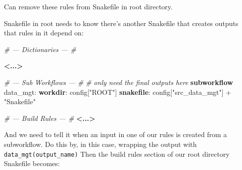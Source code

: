 \documentclass[]{book}
\newenvironment{Shaded}{\begin{snugshade}}{\end{snugshade}}
\newcommand{\KeywordTok}[1]{\textcolor[rgb]{0.13,0.29,0.53}{\textbf{{#1}}}}
\newcommand{\StringTok}[1]{\textcolor[rgb]{0.31,0.60,0.02}{{#1}}}
\newcommand{\CommentTok}[1]{\textcolor[rgb]{0.56,0.35,0.01}{\textit{{#1}}}}
\newcommand{\NormalTok}[1]{{#1}}
\theoremstyle{definition}
\theoremstyle{definition}
\theoremstyle{definition}
\theoremstyle{remark}
\begin{document}
Can remove these rules from Snakefile in root directory.

Snakefile in root needs to know there's another Snakefile that creates
outputs that rules in it depend on:

\begin{Shaded}
\begin{Highlighting}[]
\CommentTok{# --- Dictionaries --- #}

\KeywordTok{<...>}

\CommentTok{# --- Sub Workflows --- #}
\CommentTok{# only need the final outputs here}
\KeywordTok{subworkflow} \NormalTok{data_mgt:}
   \KeywordTok{workdir}\NormalTok{: config[}\StringTok{"ROOT"}\NormalTok{]}
   \KeywordTok{snakefile}\NormalTok{:  config[}\StringTok{"src_data_mgt"}\NormalTok{] + }\StringTok{"Snakefile"}

\CommentTok{# --- Build Rules --- #}
\KeywordTok{<...>}
\end{Highlighting}
\end{Shaded}

And we need to tell it when an input in one of our rules is created from
a subworkflow. Do this by, in this case, wrapping the output with
\texttt{data\_mgt(output\_name)} Then the build rules section of our
root directory Snakefile becomes:
\end{document}
